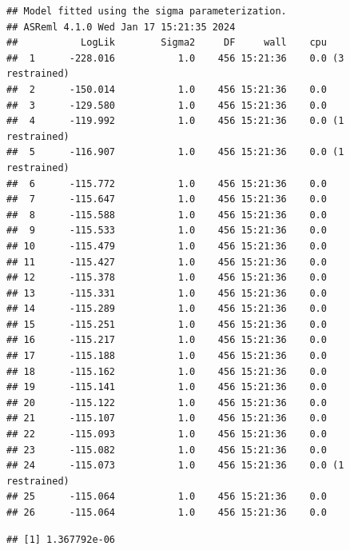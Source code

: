 \documentclass[
  12pt,
]{book}
\newenvironment{Shaded}{\begin{snugshade}}{\end{snugshade}}
\newcommand{\DataTypeTok}[1]{\textcolor[rgb]{0.13,0.29,0.53}{#1}}
\newcommand{\DecValTok}[1]{\textcolor[rgb]{0.00,0.00,0.81}{#1}}
\newcommand{\KeywordTok}[1]{\textcolor[rgb]{0.13,0.29,0.53}{\textbf{#1}}}
\newcommand{\NormalTok}[1]{#1}
\newcommand{\OperatorTok}[1]{\textcolor[rgb]{0.81,0.36,0.00}{\textbf{#1}}}
\newcommand{\OtherTok}[1]{\textcolor[rgb]{0.56,0.35,0.01}{#1}}
\newcommand{\StringTok}[1]{\textcolor[rgb]{0.31,0.60,0.02}{#1}}
\begin{document}
\begin{verbatim}
## Model fitted using the sigma parameterization.
## ASReml 4.1.0 Wed Jan 17 15:21:35 2024
##           LogLik        Sigma2     DF     wall    cpu
##  1      -228.016           1.0    456 15:21:36    0.0 (3 restrained)
##  2      -150.014           1.0    456 15:21:36    0.0
##  3      -129.580           1.0    456 15:21:36    0.0
##  4      -119.992           1.0    456 15:21:36    0.0 (1 restrained)
##  5      -116.907           1.0    456 15:21:36    0.0 (1 restrained)
##  6      -115.772           1.0    456 15:21:36    0.0
##  7      -115.647           1.0    456 15:21:36    0.0
##  8      -115.588           1.0    456 15:21:36    0.0
##  9      -115.533           1.0    456 15:21:36    0.0
## 10      -115.479           1.0    456 15:21:36    0.0
## 11      -115.427           1.0    456 15:21:36    0.0
## 12      -115.378           1.0    456 15:21:36    0.0
## 13      -115.331           1.0    456 15:21:36    0.0
## 14      -115.289           1.0    456 15:21:36    0.0
## 15      -115.251           1.0    456 15:21:36    0.0
## 16      -115.217           1.0    456 15:21:36    0.0
## 17      -115.188           1.0    456 15:21:36    0.0
## 18      -115.162           1.0    456 15:21:36    0.0
## 19      -115.141           1.0    456 15:21:36    0.0
## 20      -115.122           1.0    456 15:21:36    0.0
## 21      -115.107           1.0    456 15:21:36    0.0
## 22      -115.093           1.0    456 15:21:36    0.0
## 23      -115.082           1.0    456 15:21:36    0.0
## 24      -115.073           1.0    456 15:21:36    0.0 (1 restrained)
## 25      -115.064           1.0    456 15:21:36    0.0
## 26      -115.064           1.0    456 15:21:36    0.0
\end{verbatim}

\begin{Shaded}
\end{Shaded}

\begin{verbatim}
## [1] 1.367792e-06
\end{verbatim}
\end{document}
